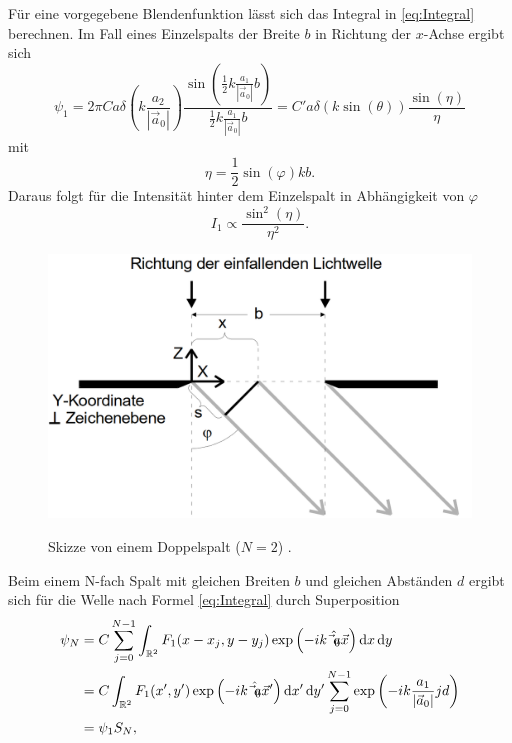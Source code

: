 Für eine vorgegebene Blendenfunktion lässt sich das Integral in \eqref{eq:Integral} berechnen. Im Fall eines Einzelspalts der Breite $b$ in Richtung der $x$-Achse ergibt sich
\begin{equation}
	\psi_1 = 2 \pi C a \delta\left(k \frac{a_2}{|\vec{a}_0|}\right) \frac{\sin\left(\frac{1}{2} k \frac{a_1}{|\vec{a}_0|} b\right)}{\frac{1}{2} k \frac{a_1}{|\vec{a}_0|} b} = C' a \delta(k \sin(\theta)) \frac{\sin(\eta)}{\eta}
\end{equation}
mit
\begin{equation}
	\eta = \frac{1}{2} \sin(\varphi) k b .
\end{equation}
Daraus folgt für die Intensität hinter dem Einzelspalt in Abhängigkeit von $\varphi$
\begin{equation}
	I_1 \propto \frac{\sin^2(\eta)}{\eta^2}\text{.} \label{eq:1Spalt}
\end{equation}
\begin{figure}
	\centering
	\caption{Skizze von einem Doppelspalt ($N=2$) \cite{V406}.}
	\includegraphics[width=\linewidth-150pt,height=\textheight-150pt,keepaspectratio]{content/images/Einzelspalt.png}
	\label{fig:Doppel}
\end{figure}
Beim einem N-fach Spalt mit gleichen Breiten $b$ und gleichen Abständen $d$ ergibt sich für die Welle nach Formel \eqref{eq:Integral} durch Superposition
\begin{equation}
\begin{split}
	\psi_{N} &=  C \sum\limits_{j=0}^{N-1} \int_{\mathbb{R}^2} F_1(x-x_j,y-y_j) \exp\left(-i k \hat{\vec{a}_0} \vec{x}\right) \mathop{}\!\mathrm{d} x \mathop{}\!\mathrm{d} y \\
	&= C \int_{\mathbb{R}^2} F_1(x',y') \exp\left(-i k \hat{\vec{a}_0} \vec{x}'\right) \mathop{}\!\mathrm{d} x' \mathop{}\!\mathrm{d} y'  \sum\limits_{j=0}^{N-1} \exp\left(-i k \frac{a_1}{|\vec{a}_0|} j d \right) \\
	&= \psi_1 S_N,
\end{split}
\end{equation}
